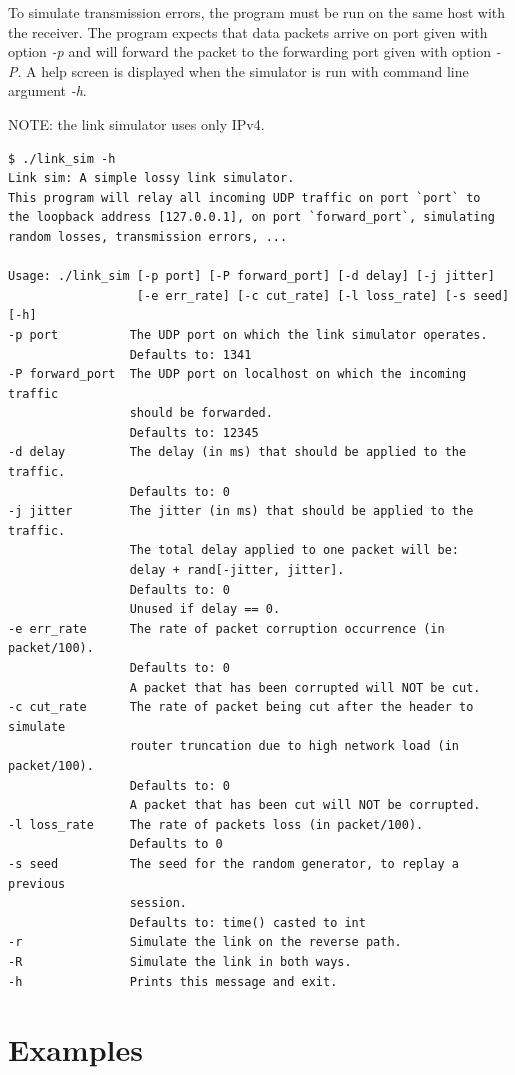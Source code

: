 \documentclass[12pt]{book}
\begin{document}
\begin{enumerate}[label=\arabic*.]
To simulate transmission errors, the program must be run on the same host with the receiver. The program expects that data packets arrive on port given with option \emph{-p} and will forward the packet to the forwarding port given with option \emph{-P}. A help screen is displayed when the simulator is run with command line argument \emph{-h}.

NOTE: the link simulator uses only IPv4.

\begin{verbatim}
$ ./link_sim -h
Link sim: A simple lossy link simulator.
This program will relay all incoming UDP traffic on port `port` to
the loopback address [127.0.0.1], on port `forward_port`, simulating 
random losses, transmission errors, ...

Usage: ./link_sim [-p port] [-P forward_port] [-d delay] [-j jitter]
                  [-e err_rate] [-c cut_rate] [-l loss_rate] [-s seed] [-h]
-p port          The UDP port on which the link simulator operates.
                 Defaults to: 1341
-P forward_port  The UDP port on localhost on which the incoming traffic
                 should be forwarded.
                 Defaults to: 12345
-d delay         The delay (in ms) that should be applied to the traffic.
                 Defaults to: 0
-j jitter        The jitter (in ms) that should be applied to the traffic.
                 The total delay applied to one packet will be:
                 delay + rand[-jitter, jitter].
                 Defaults to: 0
                 Unused if delay == 0.
-e err_rate      The rate of packet corruption occurrence (in packet/100).
                 Defaults to: 0
                 A packet that has been corrupted will NOT be cut.
-c cut_rate      The rate of packet being cut after the header to simulate
                 router truncation due to high network load (in packet/100).
                 Defaults to: 0
                 A packet that has been cut will NOT be corrupted.
-l loss_rate     The rate of packets loss (in packet/100).
                 Defaults to 0
-s seed          The seed for the random generator, to replay a previous
                 session.
                 Defaults to: time() casted to int
-r               Simulate the link on the reverse path.
-R               Simulate the link in both ways.
-h               Prints this message and exit.
\end{verbatim}


\section{Examples}


\end{enumerate}
\end{document}
